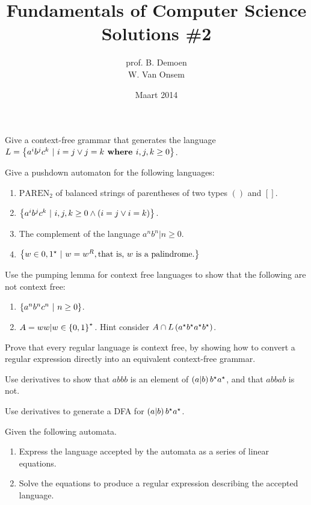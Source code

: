 \documentclass{article}
\title{Fundamentals of Computer Science\\Solutions \#2}
\author{prof. B. Demoen\\W. Van Onsem}
\date{Maart 2014}
\begin{document}
\maketitle
\begin{exercise}
Give a context-free grammar that generates the language $L=\left\{ a^ib^jc^k\ |\ i=j\vee j=k \mbox{\bf{ where }} i,j,k\geq0 \right\}$.
\end{exercise}

\begin{exercise}
Give a pushdown automaton for the following languages:
\begin{enumerate}
 \item $\mbox{PAREN}_2$ of balanced strings of parentheses of two types $()$ and $[]$.
 \item $\left\{ a^ib^jc^k\ |\ i,j,k\geq0\wedge \left( i=j\vee i=k \right) \right\}$.
 \item The complement of the language ${a^nb^n|n\geq 0}$.
 \item $\left\{ w\in{0,1}^{\star}\ |\ w=w^R, \mbox{that is, $w$ is a palindrome.} \right\}$
\end{enumerate}
\end{exercise}

\begin{exercise}
Use the pumping lemma for context free languages to show that the following are not context free:
\begin{enumerate}
 \item $\left\{ a^nb^nc^n\ |\ n\geq0 \right\}$.
 \item $A = {ww|w\in\left\{ 0,1 \right\}^\star{}}$. Hint consider $A\cap L\left( a^{\star}b^{\star}a^{\star}b^{\star} \right)$.
\end{enumerate}
\end{exercise}

\begin{exercise}
Prove that every regular language is context free, by showing how to convert a regular expression directly into an equivalent context-free grammar.
\end{exercise}

\begin{exercise}
Use derivatives to show that $abbb$ is an element of $\left( a|b \right)b^{\star}a^{\star}$, and that $abbab$ is not.
\end{exercise}

\begin{exercise}
Use derivatives to generate a DFA for $\left( a|b \right)b^{\star}a^{\star}$.
\end{exercise}

\begin{exercise}
Given the following automata.


\begin{enumerate}
 \item Express the language accepted by the automata as a series of linear equations.
 \item Solve the equations to produce a regular expression describing the accepted language.
\end{enumerate}
\end{exercise}
\end{document}
